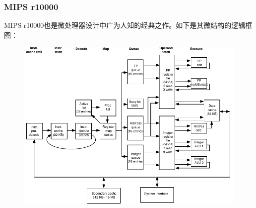 \documentclass{article}
\begin{document}
	\subsubsection{MIPS r10000}
	MIPS r10000也是微处理器设计中广为人知的经典之作。如下是其微结构的逻辑框图：~\cite{mips}
	\begin{figure}[H]
		\centering
		\includegraphics[width=0.6\linewidth]{figs/MIPSr10000.png}
	\end{figure}
\end{document}
